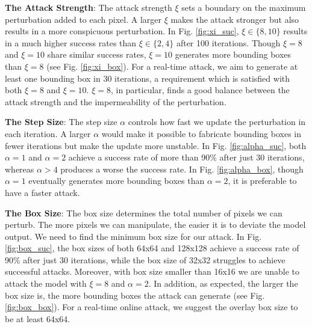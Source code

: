 \textbf{The Attack Strength}: The attack strength $\xi$ sets a boundary on the maximum perturbation added to each pixel. A larger $\xi$ makes the attack stronger but also results in a more conspicuous perturbation. In Fig. \ref{fig:xi_suc}, $\xi \in \{8, 10\}$ results in a much higher success rates than $\xi \in \{2, 4\}$ after 100 iterations. Though $\xi=8$ and $\xi=10$ share similar success rates, $\xi=10$ generates more bounding boxes than $\xi=8$ (see Fig. \ref{fig:xi_box}). For a real-time attack, we aim to generate at least one bounding box in 30 iterations, a requirement which is satisfied with both $\xi=8$ and $\xi=10$. $\xi=8$, in particular, finds a good balance between the attack strength and the impermeability of the perturbation.

\textbf{The Step Size}: The step size $\alpha$ controls how fast we update the perturbation in each iteration. A larger $\alpha$ would make it possible to fabricate bounding boxes in fewer iterations but make the update more unstable. In Fig. \ref{fig:alpha_suc}, both $\alpha=1$ and $\alpha=2$ achieve a success rate of more than 90\% after just 30 iterations, whereas $\alpha > 4$ produces a worse the success rate. In Fig. \ref{fig:alpha_box}, though $\alpha=1$ eventually generates more bounding boxes than $\alpha=2$, it is preferable to have a faster attack.

\textbf{The Box Size}: The box size determines the total number of pixels we can perturb. The more pixels we can manipulate, the easier it is to deviate the model output. We need to find the minimum box size for our attack. In Fig. \ref{fig:box_suc}, the box sizes of both 64x64 and 128x128 achieve a success rate of 90\% after just 30 iterations, while the box size of 32x32 struggles to achieve successful attacks. Moreover, with box size smaller than 16x16 we are unable to attack the model with $\xi=8$ and $\alpha=2$. In addition, as expected, the larger the box size is, the more bounding boxes the attack can generate (see Fig. \ref{fig:box_box}). For a real-time online attack, we suggest the overlay box size to be at least 64x64.

